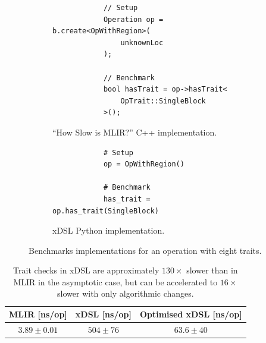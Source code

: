 \begin{figure}[H]
    \centering
    \begin{subfigure}[b]{0.45\textwidth}
       \centering
        \begin{verbatim}
            // Setup
            Operation op = b.create<OpWithRegion>(
                unknownLoc
            );
            
            // Benchmark
            bool hasTrait = op->hasTrait<
                OpTrait::SingleBlock
            >();
        \end{verbatim}
        \caption{``How Slow is MLIR?'' C++ implementation.}
        \label{listing:ubenchmark-trait-checks-bench-mlir}
    \end{subfigure}
    \hfill
    \begin{subfigure}[b]{0.45\textwidth}
        \centering
        \begin{verbatim}
            # Setup
            op = OpWithRegion()
            
            # Benchmark
            has_trait = op.has_trait(SingleBlock)
        \end{verbatim}
        \footnotesize\vspace{2em}
        \caption{xDSL Python implementation.}
        \label{listing:ubenchmark-trait-checks-bench-xdsl}
    \end{subfigure}
    \vspace{1em}
    \captionsetup{name=Listing}
    \caption{Benchmarks implementations for an operation with eight traits.} 
    \label{listing:ubenchmark-trait-checks-bench}
\end{figure}


\begin{table}[H]
  \caption{Trait checks in xDSL are approximately $130\times$ slower than in MLIR in the asymptotic case, but can be accelerated to $16\times$ slower with only algorithmic changes.} %
  \label{tab:ubenchmark-trait-checks}
  \centering
  \begin{tabular}{ccc}
    \toprule
    \textbf{MLIR [ns/op]} & \textbf{xDSL [ns/op]} & \textbf{Optimised xDSL [ns/op]} \\
    \midrule
    $3.89 \pm 0.01$ & $504 \pm 76$ & $63.6 \pm 40$\\
    \bottomrule
  \end{tabular}
\end{table}



